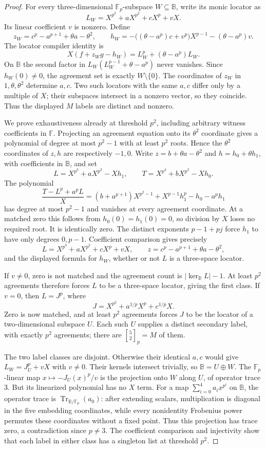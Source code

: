 \begin{proof}
For every three-dimensional $\mathbb F_p$-subspace $W\subseteq\mathbb B$,
write its monic locator as
\[
 L_W=X^{p^3}+aX^{p^2}+cX^p+vX.
\]
Its linear coefficient $v$ is nonzero. Define
\[
 z_W=c^p-a^{p+1}+\theta a-\theta^2,
 \qquad
 h_W=-\bigl((\theta-a^p)c+v^p\bigr)X^{p-1}
        -(\theta-a^p)v.
\]
The locator compiler identity is
\[
 X(f+z_Wg-h_W)=L_W^p+(\theta-a^p)L_W.
\]
On $\mathbb B$ the second factor in
$L_W(L_W^{p-1}+\theta-a^p)$ never vanishes. Since $h_W(0)\ne0$,
the agreement set is exactly $W\setminus\{0\}$.
The coordinates of $z_W$ in $1,\theta,\theta^2$ determine $a,c$.
Two such locators with the same $a,c$ differ only by a multiple of $X$;
their subspaces intersect in a nonzero vector, so they coincide.
Thus the displayed $M$ labels are distinct and nonzero.

We prove exhaustiveness already at threshold $p^2$, including arbitrary
witness coefficients in $\mathbb F$. Projecting an agreement equation
onto its $\theta^2$ coordinate gives a polynomial of degree at most
$p^2-1$ with at least $p^2$ roots. Hence the $\theta^2$ coordinates of
$z,h$ are respectively $-1,0$. Write
$z=b+\theta a-\theta^2$ and $h=h_0+\theta h_1$, with coefficients
in $\mathbb B$, and set
\[
 L=X^{p^3}+aX^{p^2}-Xh_1,\qquad
 T=X^{p^4}+bX^{p^2}-Xh_0.
\]
The polynomial
\[
 \frac{T-L^p+a^pL}{X}
 =(b+a^{p+1})X^{p^2-1}+X^{p-1}h_1^p-h_0-a^ph_1
\]
has degree at most $p^2-1$ and vanishes at every agreement coordinate.
At a matched zero this follows from $h_0(0)=h_1(0)=0$, so division by
$X$ loses no required root. It is identically zero. The distinct
exponents $p-1+pj$ force $h_1$ to have only degrees $0,p-1$.
Coefficient comparison gives precisely
\[
 L=X^{p^3}+aX^{p^2}+cX^p+vX,\qquad
 z=c^p-a^{p+1}+\theta a-\theta^2,
\]
and the displayed formula for $h_W$, whether or not $L$ is a
three-space locator.

If $v\ne0$, zero is not matched and the agreement count is
$|\ker_{\mathbb B}L|-1$. At least $p^2$ agreements therefore forces
$L$ to be a three-space locator, giving the first class.
If $v=0$, then $L=J^p$, where
\[
 J=X^{p^2}+a^{1/p}X^p+c^{1/p}X.
\]
Zero is now matched, and at least $p^2$ agreements forces $J$ to be
the locator of a two-dimensional subspace $U$. Each such $U$ supplies
a distinct secondary label, with exactly $p^2$ agreements; there are
$\genfrac{[}{]}{0pt}{}{5}{2}_p=M$ of them.

The two label classes are disjoint. Otherwise their identical $a,c$
would give $L_W=J_U^p+vX$ with $v\ne0$.
Their kernels intersect trivially, so $\mathbb B=U\oplus W$.
The $\mathbb F_p$-linear map $x\mapsto-J_U(x)^p/v$ is the projection
onto $W$ along $U$, of operator trace $3$. But its linearized polynomial
has no $X$ term. For a map $\sum_{i=0}^4 a_i x^{p^i}$ on $\mathbb B$,
the operator trace is $\operatorname{Tr}_{\mathbb B/\mathbb F_p}(a_0)$:
after extending scalars, multiplication is diagonal in the five embedding
coordinates, while every nonidentity Frobenius power permutes these
coordinates without a fixed point. Thus this projection has trace zero,
a contradiction since $p\ne3$.
The coefficient comparison and injectivity show that each label in
either class has a singleton list at threshold $p^2$.


\end{proof}
